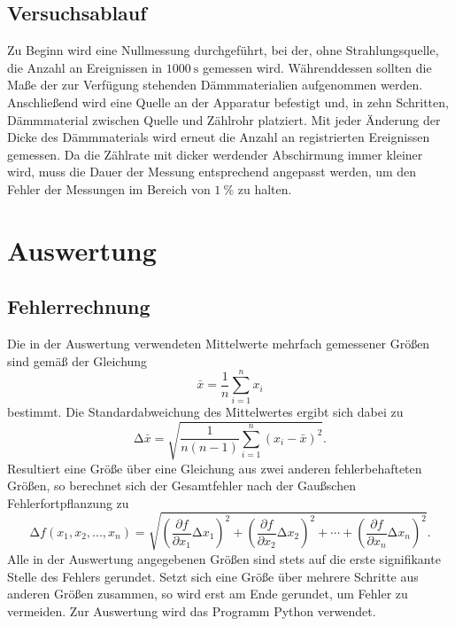 \documentclass[
  bibliography=totoc,     %
  captions=tableheading,  %
  titlepage=firstiscover, %
]{scrartcl}
\begin{document}
\subsection{Versuchsablauf}
Zu Beginn wird eine Nullmessung durchgeführt, bei der, ohne Strahlungsquelle,
die Anzahl an Ereignissen in $\SI{1000}{\second}$ gemessen wird.
Währenddessen sollten die Maße der zur Verfügung stehenden Dämmmaterialien
aufgenommen werden. Anschließend wird eine Quelle an der Apparatur befestigt
und, in zehn Schritten, Dämmmaterial zwischen Quelle und Zählrohr platziert.
Mit jeder Änderung der Dicke des Dämmmaterials wird erneut die Anzahl an
registrierten Ereignissen gemessen. Da die Zählrate mit dicker werdender
Abschirmung immer kleiner wird, muss die Dauer der Messung entsprechend
angepasst werden, um den Fehler der Messungen im Bereich von $\SI{1}{\percent}$
zu halten.
\section{Auswertung}
\label{sec:auswertung}
\subsection{Fehlerrechnung}
\label{sec:fehlerrechnung}
Die in der Auswertung verwendeten Mittelwerte mehrfach gemessener Größen sind gemäß der
Gleichung
\begin{equation}
\bar{x}=\frac{1}{n}\sum_{i=1}^n x_i
\label{eqn:mittelwert}
\end{equation}
bestimmt. Die Standardabweichung des Mittelwertes ergibt sich dabei zu
\begin{equation}
\mathup{\Delta}\bar{x}=\sqrt{\frac{1}{n(n-1)}\sum_{i=1}^n\left(x_i-\bar{x}\right)^2}.
\label{eqn:standardabweichung}
\end{equation}
Resultiert eine Größe über eine Gleichung aus zwei anderen fehlerbehafteten Größen, so
berechnet sich der Gesamtfehler nach der Gaußschen Fehlerfortpflanzung zu
\begin{equation}
\mathup{\Delta}f(x_1,x_2,...,x_n)=\sqrt{\left(\frac{\partial f}{\partial x_1}\mathup{\Delta}x_1\right)^2+\left(\frac{\partial f}{\partial x_2}\mathup{\Delta}x_2\right)^2+ \dotsb +\left(\frac{\partial f}{\partial x_n}\mathup{\Delta}x_n\right)^2}.
\label{eqn:fehlerfortpflanzung}
\end{equation}
Alle in der Auswertung angegebenen Größen sind stets auf die erste signifikante Stelle des
Fehlers gerundet. Setzt sich eine Größe über mehrere Schritte aus anderen Größen zusammen,
so wird erst am Ende gerundet, um Fehler zu vermeiden. Zur Auswertung wird das Programm
Python verwendet.
\end{document}
